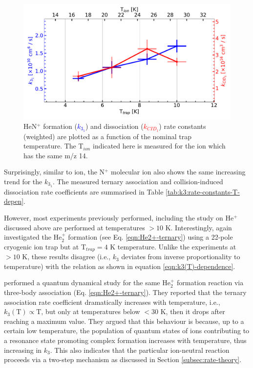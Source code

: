 \begin{figure}[!htb]
    \centering
    \includegraphics[width=1\textwidth]{figures/measurements/kinetics/functionOf_T/N+/off_k3_kCID_as_functionOfT_with_Tcol.pdf}
    \caption{HeN$^+$ formation (\textcolor{blue}{$k_{3_1}$}) and dissociation (\textcolor{red}{$k_{CID_1}$}) rate constants (weighted) are plotted as a function of the nominal trap temperature. The T$_{ion}$ indicated here is measured for the \CD ion which has the same m/z 14.}
    \label{fig:HeN+:rate-constants-f(t)}
\end{figure}


Surprisingly, similar to \CD ion, the N$^+$ molecular ion also shows the same increasing trend for the $k_{3_1}$. The measured ternary association and collision-induced dissociation rate coefficients are summarised in Table \ref{tab:k3:rate-constants-T-depen}.

However, most experiments previously performed, including the study on He$^+$
discussed above are performed at temperatures $>10$ K.
Interestingly, \citet{gerlich_infrared_2018} again investigated the He$_2^+$
formation (see Eq. \ref{eqn:He2+-ternary}) using a 22-pole cryogenic ion trap
but at T$_{trap}=4$ K temperature. Unlike the experiments at $>10$ K, these results disagree (i.e., $k_3$ deviates from inverse proportionality to temperature) with the
relation as shown in equation \ref{eqn:k3(T)-dependence}.

\citet{xie_quantum_2003} performed a quantum dynamical study for the same He$_2^+$ formation reaction via three-body association (Eq. \ref{eqn:He2+-ternary}). They reported that the ternary association rate coefficient dramatically increases with temperature, i.e., $k_3(\text{T}) \propto \text{T}$, but only at temperatures below $< 30$ K, then it drops after reaching a maximum value. They argued that this behaviour is because, up to a certain low temperature, the population of quantum states of ions contributing to a resonance state promoting complex formation increases with temperature, thus increasing in $k_3$. This also indicates that the particular ion-neutral reaction proceeds via a two-step mechanism as discussed in Section \ref{subsec:rate-theory}.

